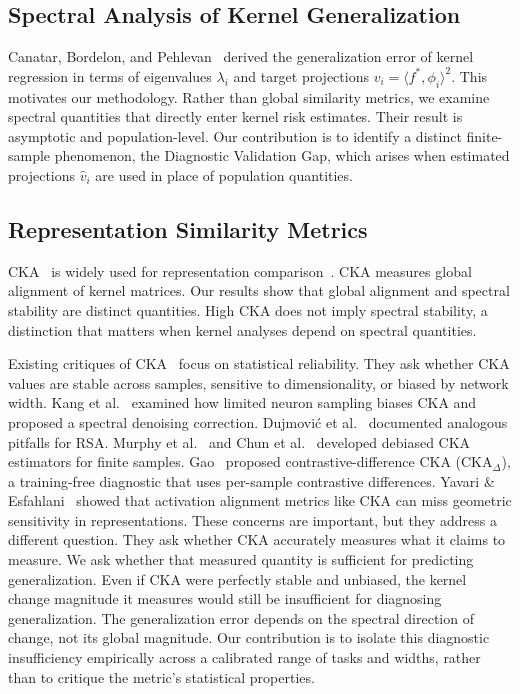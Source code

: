 \documentclass[twoside,11pt]{article}
\begin{document}
\subsection{Spectral Analysis of Kernel Generalization}
Canatar, Bordelon, and Pehlevan~\cite{canatar2021spectral} derived the generalization error of kernel regression in terms of eigenvalues $\lambda_{i}$ and target projections $v_{i}=\langle f^{*},\phi_{i}\rangle^{2}$.  This motivates our methodology. Rather than global similarity metrics, we examine spectral quantities that directly enter kernel risk estimates.  Their result is asymptotic and population-level. Our contribution is to identify a distinct finite-sample phenomenon, the Diagnostic Validation Gap, which arises when estimated projections $\hat{v}_i$ are used in place of population quantities.

\subsection{Representation Similarity Metrics}
CKA~\citep{kornblith2019similarity} is widely used for representation comparison~\citep{raghu2017svcca,morcos2018insights,klabunde2023similarity}.  CKA measures global alignment of kernel matrices.  Our results show that global alignment and spectral stability are distinct quantities.  High CKA does not imply spectral stability, a distinction that matters when kernel analyses depend on spectral quantities.

Existing critiques of CKA~\citep{davari2022reliability,ding2021grounding} focus on statistical reliability. They ask whether CKA values are stable across samples, sensitive to dimensionality, or biased by network width.  Kang et al.~\cite{kang2025spectral} examined how limited neuron sampling biases CKA and proposed a spectral denoising correction.  Dujmović et al.~\cite{dujmovic2023pitfalls} documented analogous pitfalls for RSA.  Murphy et al.~\cite{murphy2024correcting} and Chun et al.~\cite{chun2025estimating} developed debiased CKA estimators for finite samples.  Gao~\cite{gao2026contrastive} proposed contrastive-difference CKA ($\text{CKA}_\Delta$), a training-free diagnostic that uses per-sample contrastive differences.  Yavari \& Esfahlani~\cite{yavari2026beyond} showed that activation alignment metrics like CKA can miss geometric sensitivity in representations.  These concerns are important, but they address a different question. They ask whether CKA accurately measures what it claims to measure. We ask whether that measured quantity is sufficient for predicting generalization.  Even if CKA were perfectly stable and unbiased, the kernel change magnitude it measures would still be insufficient for diagnosing generalization. The generalization error depends on the spectral direction of change, not its global magnitude.  Our contribution is to isolate this diagnostic insufficiency empirically across a calibrated range of tasks and widths, rather than to critique the metric's statistical properties.
\end{document}
